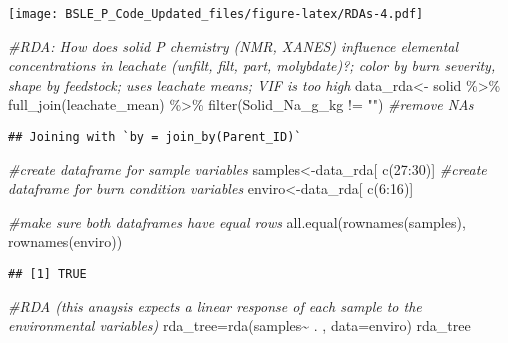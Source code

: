 \documentclass[
]{article}
\newenvironment{Shaded}{\begin{snugshade}}{\end{snugshade}}
\newcommand{\AttributeTok}[1]{\textcolor[rgb]{0.77,0.63,0.00}{#1}}
\newcommand{\CommentTok}[1]{\textcolor[rgb]{0.56,0.35,0.01}{\textit{#1}}}
\newcommand{\DecValTok}[1]{\textcolor[rgb]{0.00,0.00,0.81}{#1}}
\newcommand{\FunctionTok}[1]{\textcolor[rgb]{0.00,0.00,0.00}{#1}}
\newcommand{\NormalTok}[1]{#1}
\newcommand{\OtherTok}[1]{\textcolor[rgb]{0.56,0.35,0.01}{#1}}
\newcommand{\SpecialCharTok}[1]{\textcolor[rgb]{0.00,0.00,0.00}{#1}}
\newcommand{\StringTok}[1]{\textcolor[rgb]{0.31,0.60,0.02}{#1}}
\begin{document}
\texttt{[image: BSLE\_P\_Code\_Updated\_files/figure-latex/RDAs-4.pdf]}

\begin{Shaded}
\begin{Highlighting}[]
\CommentTok{\#RDA: How does solid P chemistry (NMR, XANES) influence elemental concentrations in leachate (unfilt, filt, part, molybdate)?; color by burn severity, shape by feedstock; uses leachate means; VIF is too high}
\NormalTok{data\_rda}\OtherTok{\textless{}{-}}\NormalTok{ solid }\SpecialCharTok{\%\textgreater{}\%}
  \FunctionTok{full\_join}\NormalTok{(leachate\_mean) }\SpecialCharTok{\%\textgreater{}\%}
  \FunctionTok{filter}\NormalTok{(Solid\_Na\_g\_kg }\SpecialCharTok{!=} \StringTok{""}\NormalTok{) }\CommentTok{\#remove NAs}
\end{Highlighting}
\end{Shaded}

\begin{verbatim}
## Joining with `by = join_by(Parent_ID)`
\end{verbatim}

\begin{Shaded}
\begin{Highlighting}[]
\CommentTok{\#create dataframe for sample variables}
\NormalTok{samples}\OtherTok{\textless{}{-}}\NormalTok{data\_rda[ }\FunctionTok{c}\NormalTok{(}\DecValTok{27}\SpecialCharTok{:}\DecValTok{30}\NormalTok{)]}
\CommentTok{\#create dataframe for burn condition variables}
\NormalTok{enviro}\OtherTok{\textless{}{-}}\NormalTok{data\_rda[ }\FunctionTok{c}\NormalTok{(}\DecValTok{6}\SpecialCharTok{:}\DecValTok{16}\NormalTok{)]}

\CommentTok{\#make sure both dataframes have equal rows}
\FunctionTok{all.equal}\NormalTok{(}\FunctionTok{rownames}\NormalTok{(samples), }\FunctionTok{rownames}\NormalTok{(enviro))}
\end{Highlighting}
\end{Shaded}

\begin{verbatim}
## [1] TRUE
\end{verbatim}

\begin{Shaded}
\begin{Highlighting}[]
\CommentTok{\#RDA (this anaysis expects a linear response of each sample to the environmental variables)}
\NormalTok{rda\_tree}\OtherTok{=}\FunctionTok{rda}\NormalTok{(samples}\SpecialCharTok{\textasciitilde{}}\NormalTok{ . , }\AttributeTok{data=}\NormalTok{enviro)}
\NormalTok{rda\_tree}
\end{Highlighting}
\end{Shaded}
\end{document}
